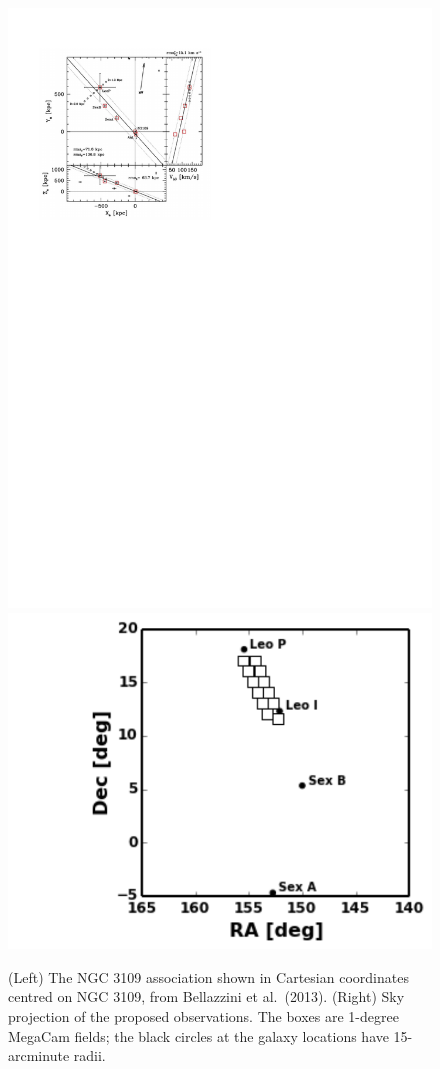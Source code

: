 \thispagestyle{empty}


\begin{figure}
\includegraphics[scale=0.5]{bellaz_fig1}
\includegraphics[scale=0.5]{fields_leoi_new}
\caption{(Left) The NGC 3109 association shown in Cartesian coordinates centred on NGC 3109,  from Bellazzini et al.\ (2013).
(Right) Sky projection of the proposed observations. The boxes are 1-degree MegaCam fields; the black circles at the galaxy
locations have 15-arcminute radii. 
}
\end{figure}



